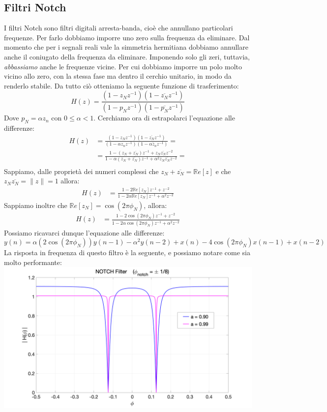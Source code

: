 \subsection{Filtri Notch}
I filtri Notch sono filtri digitali arresta-banda, cioè che annullano particolari frequenze. Per farlo dobbiamo 
imporre uno zero sulla frequenza da eliminare. Dal momento che per i segnali reali vale la simmetria hermitiana
dobbiamo annullare anche il coniugato della frequenza da eliminare. Imponendo solo gli zeri, tuttavia, \textit{abbassiamo}
anche le frequenze vicine. Per cui dobbiamo imporre un polo molto vicino allo zero, con la stessa fase ma dentro il cerchio
unitario, in modo da renderlo stabile. Da tutto ciò otteniamo la seguente funzione di trasferimento:
\begin{equation}
    H(z) = \frac{(1 - z_Nz^{-1})(1 - \overline{z_N}z^{-1})}{(1 - p_Nz^{-1})(1 - \overline{p_N}z^{-1})}
\end{equation}
Dove $p_N = \alpha z_n$ con $0 \leq \alpha < 1$. Cerchiamo ora di estrapolarci l'equazione alle differenze:
\begin{align*}
    H(z) &= \frac{(1 - z_Nz^{-1})(1 - \overline{z_N}z^{-1})}{(1 - \alpha z_nz^{-1})(1 - \overline{\alpha z_n}z^{-1})} =\\
         &= \frac{1 - (z_N + \overline{z_N})z^{-1} + z_N\overline{z_N}z^{-2}}{1 - \alpha(z_N + \overline{z_N})z^{-1} + \alpha^2z_N\overline{z_N}z^{-2}} =\\
\end{align*}
Sappiamo, dalle proprietà dei numeri complessi che $z_N + \overline{z_N} = \mathbb{R}e[z]$ e che $z_N\overline{z_N} = \| z\| = 1 $ allora:
\begin{align*}
    H(z) &= \frac{1 - 2\mathbb{R}e[z_N]z^{-1} + z^{-2}}{1 - 2\alpha\mathbb{R}e[z_N]z^{-1} + \alpha^2z^{-2}}
\end{align*}
Sappiamo inoltre che $\mathbb{R}e[z_N] = \cos(2\pi\phi_N)$, allora:
\begin{align*}
    H(z) &= \frac{1 - 2\cos(2\pi\phi_N)z^{-1} + z^{-2}}{1 - 2\alpha\cos(2\pi\phi_N)z^{-1} + \alpha^2z^{-2}}
\end{align*}
Possiamo ricavarci dunque l'equazione alle differenze:
\begin{equation}
    y(n) = \alpha(2\cos(2\pi\phi_N))y(n-1) - \alpha^2y(n - 2) + x(n) - 4\cos(2\pi\phi_N)x(n-1) + x(n-2)
\end{equation}
La risposta in frequenza di questo filtro è la seguente, e possiamo notare come sia molto performante:\\
\includegraphics[width=15cm]{src/NotchFilter.png}